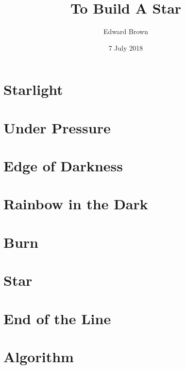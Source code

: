 \documentclass[symmetric]{astro-bookshelf}
\title{To Build A Star}
\author{Edward Brown}
\date{7 July 2018}
\begin{document}
\frontmatter
{}


\mainmatter
{}
\setcounter{page}{1}

\chapter{Starlight}\label{ch.starlight}


\chapter{Under Pressure}\label{ch.basic-stellar-properties}


\chapter{Edge of Darkness}\label{ch.radiative-transport}


\chapter{Rainbow in the Dark}\label{ch.classifying-stars}


\chapter{Burn}\label{ch.nuclear-burning}


\chapter{Star}\label{ch.main-sequence}


\chapter{End of the Line}\label{ch.post-main-sequence}


\appendix
\chapter{Algorithm}\label{ch.numerical-methods}


\backmatter


\end{document}
